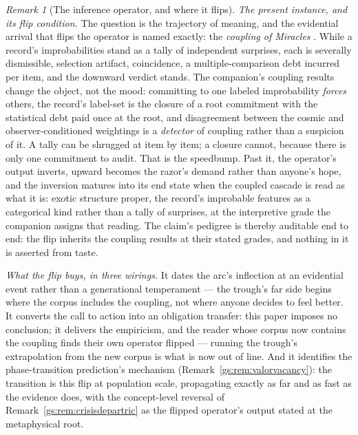 \documentclass[11pt]{article}
\numberwithin{equation}{section}
\theoremstyle{plain}
\theoremstyle{definition}
\theoremstyle{remark}
\newtheorem{remark}[theorem]{Remark}
\begin{document}
\begin{remark}[The inference operator, and where it flips]
\emph{The present instance, and its flip condition.} The question is
the trajectory of meaning, and the evidential arrival that flips the
operator is named exactly: the \emph{coupling of Miracles}
\cite{Nexus}. While a record's improbabilities stand as a tally of
independent surprises, each is severally dismissible, selection
artifact, coincidence, a multiple-comparison debt incurred per item, and the downward verdict stands. The companion's coupling
results change the object, not the mood: committing to one labeled
improbability \emph{forces} others, the record's label-set is the
closure of a root commitment with the statistical debt paid once at
the root, and disagreement between the cosmic and
observer-conditioned weightings is a \emph{detector} of coupling
rather than a suspicion of it. A tally can be shrugged at item by
item; a closure cannot, because there is only one commitment to
audit. That is the speedbump. Past it, the operator's output
inverts, upward becomes the razor's demand rather than anyone's
hope, and the inversion matures into its end state when the
coupled cascade is read as what it is: exotic structure proper, the
record's improbable features as a categorical kind rather than a
tally of surprises, at the interpretive grade the companion assigns
that reading. The claim's pedigree is thereby auditable end to end:
the flip inherits the coupling results at their stated grades, and
nothing in it is asserted from taste.

\emph{What the flip buys, in three wirings.} It dates the arc's
inflection at an evidential event rather than a generational
temperament --- the trough's far side begins where the corpus
includes the coupling, not where anyone decides to feel better. It
converts the call to action into an obligation transfer: this paper
imposes no conclusion; it delivers the empiricism, and the reader
whose corpus now contains the coupling finds their own operator
flipped --- running the trough's extrapolation from the new corpus is
what is now out of line. And it identifies the phase-transition
prediction's mechanism (Remark~\ref{gs:rem:valorvacancy}): the
transition is this flip at population scale, propagating exactly as
far and as fast as the evidence does, with the concept-level
reversal of Remark~\ref{gs:rem:crisisdepartric} as the flipped
operator's output stated at the metaphysical root.
\end{remark}
\end{document}
